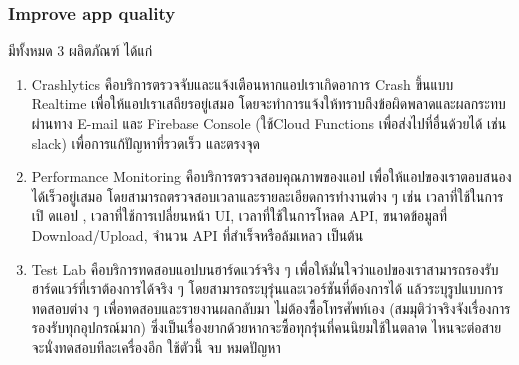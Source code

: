\subsubsection{Improve app quality}
มีทั้งหมด 3 ผลิตภัณฑ์ ได้แก่
\begin{enumerate}
  \item Crashlytics คือบริการตรวจจับและแจ้งเตือนหากแอปเราเกิดอาการ Crash ขึ้นแบบ Realtime
  เพื่อให้แอปเราเสถียรอยู่เสมอ โดยจะทําการแจ้งให้ทราบถึงข้อผิดพลาดและผลกระทบ ผ่านทาง E-mail และ
  Firebase Console (ใช้Cloud Functions เพื่อส่งไปที่อื่นด้วยได้ เช่น slack) เพื่อการแก้ปัญหาที่รวดเร็ว
  และตรงจุด
  
  \item Performance Monitoring คือบริการตรวจสอบคุณภาพของแอป เพื่อให้แอปของเราตอบสนอง
  ได้เร็วอยู่เสมอ โดยสามารถตรวจสอบเวลาและรายละเอียดการทํางานต่าง ๆ เช่น เวลาที่ใช้ในการเปิ ดแอป ,
  เวลาที่ใช้การเปลี่ยนหน้า UI, เวลาที่ใช้ในการโหลด API, ขนาดข้อมูลที่ Download/Upload, จํานวน
  API ที่สําเร็จหรือล้มเหลว เป็นต้น
  
  \item  Test Lab คือบริการทดสอบแอปบนฮาร์ดแวร์จริง ๆ เพื่อให้มั่นใจว่าแอปของเราสามารถรองรับ
  ฮาร์ดแวร์ที่เราต้องการได้จริง ๆ โดยสามารถระบุรุ่นและเวอร์ชันที่ต้องการได้ แล้วระบุรูปแบบการทดสอบต่าง
  ๆ เพื่อทดสอบและรายงานผลกลับมา ไม่ต้องซื้อโทรศัพท์เอง (สมมุติว่าจริงจังเรื่องการรองรับทุกอุปกรณ์มาก)
  ซึ่งเป็นเรื่องยากด้วยหากจะซื้อทุกรุ่นที่คนนิยมใช้ในตลาด ไหนจะต่อสาย จะนั่งทดสอบทีละเครื่องอีก ใช้ตัวนี้
  จบ หมดปัญหา
\end{enumerate}

